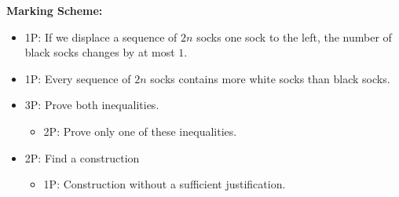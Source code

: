 \textbf{Marking Scheme:}
\begin{itemize}
    \item 1P: If we displace a sequence of $2n$ socks one sock to the left, the number of black socks changes by at most $1$.
    \item 1P: Every sequence of $2n$ socks contains more white socks than black socks.
    \item 3P: Prove both inequalities.
    \begin{itemize}
        \item 2P: Prove only one of these inequalities.
    \end{itemize}
    \item 2P: Find a construction
    \begin{itemize}
        \item 1P: Construction without a sufficient justification.
    \end{itemize}
\end{itemize}